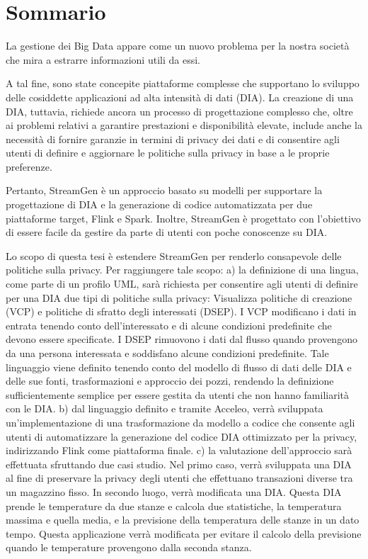 \documentclass[12pt,twoside]{book}
\begin{document}
\chapter*{Sommario}

La gestione dei Big Data appare come un nuovo problema per la nostra società che mira a estrarre informazioni utili da essi.

A tal fine, sono state concepite piattaforme complesse che supportano lo sviluppo delle cosiddette applicazioni ad alta intensità di dati (DIA). La creazione di una DIA, tuttavia, richiede ancora un processo di progettazione complesso che, oltre ai problemi relativi a garantire prestazioni e disponibilità elevate, include anche la necessità di fornire garanzie in termini di privacy dei dati e di consentire agli utenti di definire e aggiornare le politiche sulla privacy in base a le proprie preferenze.

Pertanto, StreamGen è un approccio basato su modelli per supportare la progettazione di DIA e la generazione di codice automatizzata per due piattaforme target, Flink e Spark. Inoltre, StreamGen è progettato con l'obiettivo di essere facile da gestire da parte di utenti con poche conoscenze su DIA.

Lo scopo di questa tesi è estendere StreamGen per renderlo consapevole delle politiche sulla privacy. Per raggiungere tale scopo:
a) la definizione di una lingua, come parte di un profilo UML, sarà richiesta per consentire agli utenti di definire per una DIA due tipi di politiche sulla privacy: Visualizza politiche di creazione (VCP) e politiche di sfratto degli interessati (DSEP). I VCP modificano i dati in entrata tenendo conto dell'interessato e di alcune condizioni predefinite che devono essere specificate. I DSEP rimuovono i dati dal flusso quando provengono da una persona interessata e soddisfano alcune condizioni predefinite. Tale linguaggio viene definito tenendo conto del modello di flusso di dati delle DIA e delle sue fonti, trasformazioni e approccio dei pozzi, rendendo la definizione sufficientemente semplice per essere gestita da utenti che non hanno familiarità con le DIA.
b) dal linguaggio definito e tramite Acceleo, verrà sviluppata un'implementazione di una trasformazione da modello a codice che consente agli utenti di automatizzare la generazione del codice DIA ottimizzato per la privacy, indirizzando Flink come piattaforma finale.
c) la valutazione dell'approccio sarà effettuata sfruttando due casi studio. Nel primo caso, verrà sviluppata una DIA al fine di preservare la privacy degli utenti che effettuano transazioni diverse tra un magazzino fisso. In secondo luogo, verrà modificata una DIA. Questa DIA prende le temperature da due stanze e calcola due statistiche, la temperatura massima e quella media, e la previsione della temperatura delle stanze in un dato tempo. Questa applicazione verrà modificata per evitare il calcolo della previsione quando le temperature provengono dalla seconda stanza.
\end{document}
